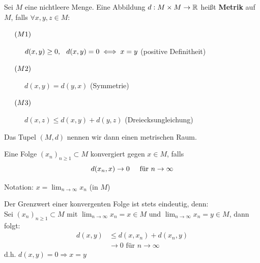 \begin{definition} 
	Sei $M$ eine nichtleere Menge. Eine Abbildung $d: M \times M \rightarrow \mathbb{R}$ hei{\ss}t \textbf{Metrik} auf $M$, falls $\forall x, y, z \in M:$
		\begin{description}
			\item[$\hspace{0.5cm} (M1) \hspace{0.1cm} $] $d(x, y) \geq 0, \hspace{0.25cm} d(x, y) = 0 \iff x = y $  (positive Definitheit)
			\item[$\hspace{0.5cm} (M2) \hspace{0.1cm} $] $d(x, y) = d(y, x)$  (Symmetrie)
			\item[$\hspace{0.5cm} (M3) \hspace{0.1cm} $] $d(x, z) \leq d(x, y) + d(y, z)$  (Dreiecksungleichung)
		\end{description}
	Das Tupel $(M, d)$ nennen wir dann einen metrischen Raum. 
\end{definition}

\begin{lemma}
	Eine Folge $(x_{n})_{n \geq 1} \subset M$ konvergiert gegen $x \in M$, falls
	\[ d(x_{n}, x) \rightarrow 0 \hspace{0.5cm} \text{für } n \rightarrow \infty \]
\end{lemma}
 
Notation: $x = \lim_{n \rightarrow \infty} x_{n}$ (in $M$)

\begin{bemerkung}
Der Grenzwert einer konvergenten Folge ist stets eindeutig, denn: \\
Sei $(x_{n})_{n \geq  1} \subset M$ mit $\lim_{n \rightarrow \infty} x_{n} = x \in M$ und $\lim_{n \rightarrow \infty} x_{n} = y \in M$, dann folgt: 
	\begin{align*}
		d(x, y) & \leq d(x, x_{n}) + d(x_{n}, y) \\
				& \rightarrow 0 \text{ für } n \rightarrow \infty
	\end{align*}
	d.h. $d(x, y) = 0 \Rightarrow x = y$
\end{bemerkung}

